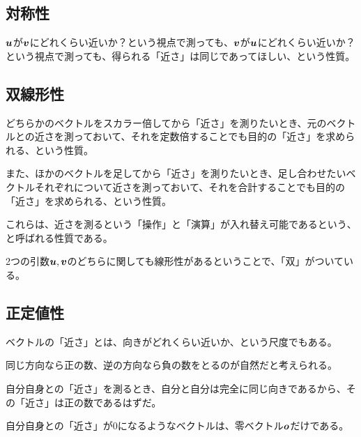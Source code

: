 \documentclass[../../../topic_linear-algebra]{subfiles}
\begin{document}
\subsection{対称性}

$\vb*{u}$が$\vb*{v}$にどれくらい近いか？という視点で測っても、$\vb*{v}$が$\vb*{u}$にどれくらい近いか？という視点で測っても、得られる「近さ」は同じであってほしい、という性質。

\subsection{双線形性}

どちらかのベクトルをスカラー倍してから「近さ」を測りたいとき、元のベクトルとの近さを測っておいて、それを定数倍することでも目的の「近さ」を求められる、という性質。

\br

また、ほかのベクトルを足してから「近さ」を測りたいとき、足し合わせたいベクトルそれぞれについて近さを測っておいて、それを合計することでも目的の「近さ」を求められる、という性質。

\br

これらは、近さを測るという「操作」と「演算」が入れ替え可能であるという、と呼ばれる性質である。

2つの引数$\vb*{u}, \vb*{v}$のどちらに関しても線形性があるということで、「双」がついている。

\subsection{正定値性}

ベクトルの「近さ」とは、向きがどれくらい近いか、という尺度でもある。

同じ方向なら正の数、逆の方向なら負の数をとるのが自然だと考えられる。

\br

自分自身との「近さ」を測るとき、自分と自分は完全に同じ向きであるから、その「近さ」は正の数であるはずだ。

自分自身との「近さ」が$0$になるようなベクトルは、零ベクトル$\vb*{o}$だけである。
\end{document}
